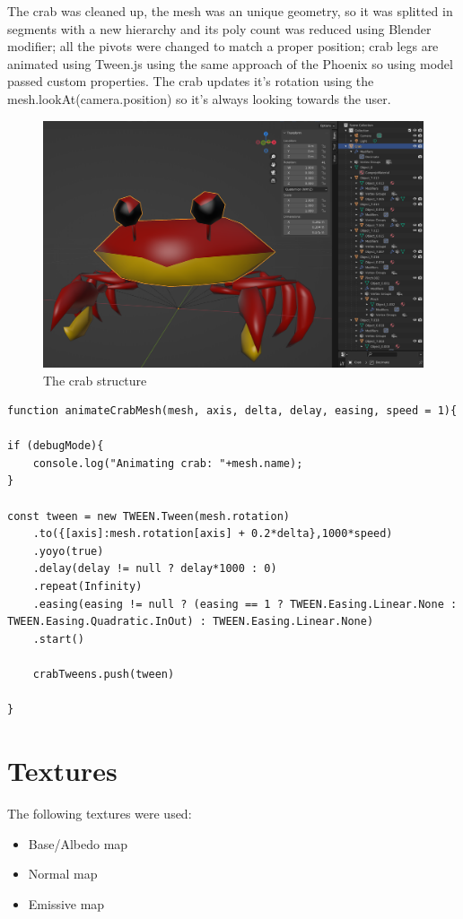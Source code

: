 \documentclass[10pt,a4paper]{article}
\begin{document}
The crab was cleaned up, the mesh was an unique geometry, so it was splitted in segments with a new hierarchy and its poly count was reduced using Blender modifier; all the pivots were changed to match a proper position; crab legs are animated using Tween.js using the same approach of the Phoenix so using model passed custom properties. The crab updates it's rotation using the mesh.lookAt(camera.position) so it's always looking towards the user.
\begin{figure}[H]
\centering
\caption{The crab structure}
\includegraphics[width=1\textwidth]{crab}
\end{figure}

\begin{verbatim}
function animateCrabMesh(mesh, axis, delta, delay, easing, speed = 1){

if (debugMode){
    console.log("Animating crab: "+mesh.name);
}

const tween = new TWEEN.Tween(mesh.rotation)
    .to({[axis]:mesh.rotation[axis] + 0.2*delta},1000*speed)
    .yoyo(true)
    .delay(delay != null ? delay*1000 : 0)
    .repeat(Infinity)
    .easing(easing != null ? (easing == 1 ? TWEEN.Easing.Linear.None : TWEEN.Easing.Quadratic.InOut) : TWEEN.Easing.Linear.None)
    .start()

    crabTweens.push(tween)

}
\end{verbatim}

\section{Textures}
The following textures were used:

\begin{itemize}
\item Base/Albedo map
\item Normal map
\item Emissive map
\end{itemize}
\end{document}
